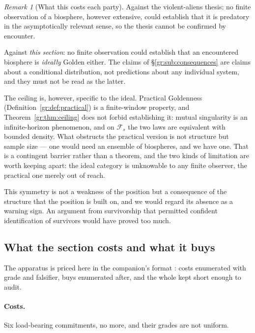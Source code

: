 \documentclass[11pt]{article}
\numberwithin{equation}{section}
\theoremstyle{plain}
\theoremstyle{definition}
\theoremstyle{remark}
\newtheorem{remark}[theorem]{Remark}
\begin{document}
\begin{remark}[What this costs each party]\label{gr:rem:evenhanded}
Against the violent-aliens thesis: no finite observation of a biosphere,
however extensive, could establish that it is predatory in the
asymptotically relevant sense, so the thesis cannot be confirmed by
encounter.

Against \emph{this section}: no finite observation could establish that
an encountered biosphere is \emph{ideally} Golden either. The claims of
\S\ref{gr:sub:consequences} are claims about a conditional
distribution, not predictions about any individual system, and they must
not be read as the latter.

The ceiling is, however, specific to the ideal. Practical Goldenness
(Definition~\ref{gr:def:practical}) is a finite-window property, and
Theorem~\ref{gr:thm:ceiling} does not forbid establishing it: mutual
singularity is an infinite-horizon phenomenon, and on $\mathcal F_s$ the
two laws are equivalent with bounded density. What obstructs the
practical version is not structure but sample size --- one would need an
ensemble of biospheres, and we have one. That is a contingent barrier
rather than a theorem, and the two kinds of limitation are worth keeping
apart: the ideal category is unknowable to any finite observer, the
practical one merely out of reach.

This symmetry is not a weakness of the position but a consequence of the
structure that the position is built on, and we would regard its absence
as a warning sign. An argument from survivorship that permitted
confident identification of survivors would have proved too much.
\end{remark}

\subsection{What the section costs and what it buys}
\label{gr:sub:ledger}

The apparatus is priced here in the companion's format
\cite{Ben26Optimal}: costs enumerated with grade and falsifier, buys
enumerated after, and the whole kept short enough to audit.

\paragraph{Costs.} Six load-bearing commitments, no more, and their
grades are not uniform.
\end{document}
